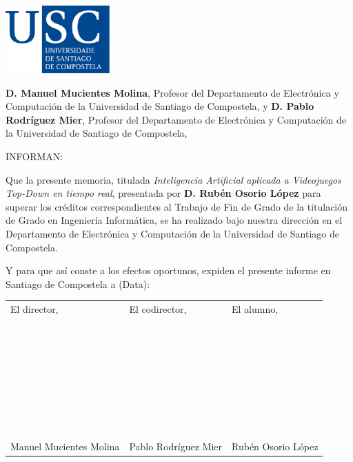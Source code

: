 \pagestyle{plain}
\includegraphics[width=4cm]{figuras/logo_usc.eps}

\vspace{1cm}
{\bf D. Manuel Mucientes Molina}, Profesor del Departamento de Electrónica y Computación de la Universidad de Santiago de Compostela, y {\bf D. Pablo Rodríguez Mier}, Profesor del Departamento de Electrónica y Computación de la Universidad de Santiago de Compostela,

\vspace{1cm}
INFORMAN:

\vspace{1cm}
Que la presente memoria, titulada {\it Inteligencia Artificial aplicada a Videojuegos Top-Down en tiempo real}, presentada por {\bf D. Rubén Osorio López} para superar los créditos correspondientes al Trabajo de Fin de Grado de la titulación de Grado en Ingeniería Informática, se ha realizado bajo nuestra dirección en el Departamento de Electrónica y Computación de la Universidad de Santiago de Compostela.

\vspace{1cm}
Y para que así conste a los efectos oportunos, expiden el presente informe en Santiago de Compostela a (Data):

\vspace{2cm}
\begin{tabular}{lll}
El director, & El codirector, & El alumno, \\
~ \\
~ \\
~ \\
~ \\
~ \\
~ \\
~ \\
Manuel Mucientes Molina & Pablo Rodríguez Mier & Rubén Osorio López
\end{tabular}

